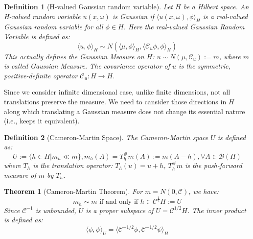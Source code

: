 \documentclass{article}
\newtheorem{theorem}{Theorem}
\newtheorem{definition}{Definition}
\begin{document}
\begin{definition}[H-valued Gaussian random variable]
  Let $H$ be a Hilbert space. An H-valued random variable $u(x, \omega)$ is Gaussian if 
  $\langle u(x, \omega), \phi\rangle_H$ is a real-valued Gaussian random variable for all $\phi \in H$.
  Here the real-valued Gaussian Random Variable is defined as:
  \begin{equation}
    \langle u, \phi\rangle_H \sim N(\langle \mu, \phi\rangle_H, \langle \mathcal{C}_u\phi, \phi\rangle_H)
  \end{equation}
  This actually defines the Gaussian Measure on $H$: $u\sim N(\mu, \mathcal{C}_u):= m$, where $m$ is called Gaussian Measure. 
  The covariance operator of $u$ is the symmetric, positive-definite operator $\mathcal{C}_u : H \rightarrow H$.
\end{definition}

Since we consider infinite dimensional case, unlike finite dimensions, not all translations preserve the measure. 
We need to cansider those directions in $H$ along which translating a Gaussian measure does not change its essential nature (i.e., keeps it equivalent). 
\begin{definition}[Cameron-Martin Space]
The Cameron-Martin space $U$ is defined as:
\begin{equation}
  U:=\{h\in H| m_h\ll m\},m_h(A)=T_h^\#m(A):= m(A-h),\forall A \in \mathcal{B}(H)
\end{equation} 
where $T_h$ is the translation operator: $T_h(u)=u + h$, $T_h^\#m$ is the push-forward measure of $m$ by $T_h$.
\end{definition}

\begin{theorem}[Cameron-Martin Theorem]
  For $m=N(0, \mathcal{C})$, we have:
  \begin{equation}
    m_h\sim m \text{ if and only if } h\in \mathcal{C}^\frac{1}{2}H:=U
  \end{equation}
  Since $\mathcal{C}^{-1}$ is unbounded, $U$ is a proper subspace of $U = \mathcal{C}^{1/2}H$.
  The inner product is defined as:
\begin{equation}
  \langle \phi, \psi\rangle_U = \langle \mathcal{C}^{-1/2}\phi, \mathcal{C}^{-1/2}\psi\rangle_H
\end{equation}
\end{theorem}
\end{document}
